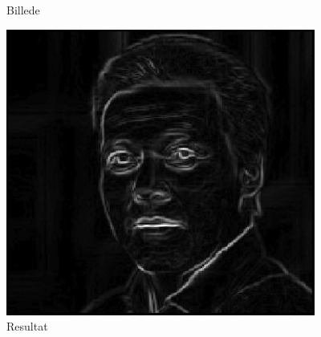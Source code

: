 \documentclass{article}
\begin{document}
\begin{itemize}
\begin{figure}
		\caption{Billede}
		\label{ke3}
	\end{figure}
	\begin{figure}
		\centering
		\includegraphics[width=4in]{test3_result.jpg}
		\caption{Resultat}
		\label{ke3r}
	\end{figure}

\end{itemize}
\end{document}
